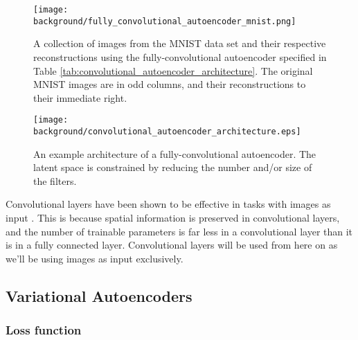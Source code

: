 \begin{figure}[h!]
\centering
\captionsetup{justification=centering}
\texttt{[image: background/fully\_convolutional\_autoencoder\_mnist.png]}
\caption{A collection of images from the MNIST data set and their respective reconstructions using the fully-convolutional autoencoder specified in Table \ref{tab:convolutional_autoencoder_architecture}. The original MNIST images are in odd columns, and their reconstructions to their immediate right.}
\label{fig:convolutional_autoencoder_mnist}
\end{figure}

\begin{figure}[h!]
\centering
\captionsetup{justification=centering}
\texttt{[image: background/convolutional\_autoencoder\_architecture.eps]}
\caption{An example architecture of a fully-convolutional autoencoder. The latent space is constrained by reducing the number and/or size of the filters.}
\label{fig:convolutional_autoencoder_architecture}
\end{figure}

Convolutional layers have been shown to be effective in tasks with images as input \cite{Krizhevsky2012, Zeiler2014, Szegedy2015}. This is because spatial information is preserved in convolutional layers, and the number of trainable parameters is far less in a convolutional layer than it is in a fully connected layer. Convolutional layers will be used from here on as we'll be using images as input exclusively.

\subsection{Variational Autoencoders}

\subsubsection{Loss function}